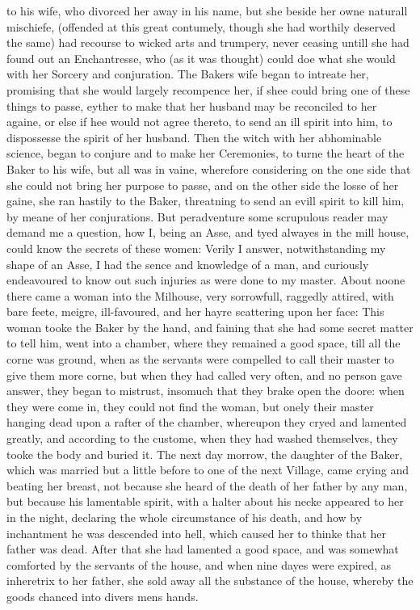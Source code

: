 to his wife, who divorced her away in his name, but she beside her owne
naturall mischiefe, (offended at this great contumely, though she had worthily
deserved the same) had recourse to wicked arts and trumpery, never ceasing
untill she had found out an Enchantresse, who (as it was thought) could doe
what she would with her Sorcery and conjuration. The Bakers wife began to
intreate her, promising that she would largely recompence her, if shee could
bring one of these things to passe, eyther to make that her husband may be
reconciled to her againe, or else if hee would not agree thereto, to send an
ill spirit into him, to dispossesse the spirit of her husband. Then the witch
with her abhominable science, began to conjure and to make her Ceremonies, to
turne the heart of the Baker to his wife, but all was in vaine, wherefore
considering on the one side that she could not bring her purpose to passe, and
on the other side the losse of her gaine, she ran hastily to the Baker,
threatning to send an evill spirit to kill him, by meane of her conjurations.
But peradventure some scrupulous reader may demand me a question, how I, being
an Asse, and tyed alwayes in the mill house, could know the secrets of these
women: Verily I answer, notwithstanding my shape of an Asse, I had the sence
and knowledge of a man, and curiously endeavoured to know out such injuries as
were done to my master. About noone there came a woman into the Milhouse, very
sorrowfull, raggedly attired, with bare feete, meigre, ill-favoured, and her
hayre scattering upon her face: This woman tooke the Baker by the hand, and
faining that she had some secret matter to tell him, went into a chamber, where
they remained a good space, till all the corne was ground, when as the servants
were compelled to call their master to give them more corne, but when they had
called very often, and no person gave answer, they began to mistrust, insomuch
that they brake open the doore: when they were come in, they could not find the
woman, but onely their master hanging dead upon a rafter of the chamber,
whereupon they cryed and lamented greatly, and according to the custome, when
they had washed themselves, they tooke the body and buried it. The next day
morrow, the daughter of the Baker, which was married but a little before to one
of the next Village, came crying and beating her breast, not because she heard
of the death of her father by any man, but because his lamentable spirit, with
a halter about his necke appeared to her in the night, declaring the whole
circumstance of his death, and how by inchantment he was descended into hell,
which caused her to thinke that her father was dead. After that she had
lamented a good space, and was somewhat comforted by the servants of the house,
and when nine dayes were expired, as inheretrix to her father, she sold away
all the substance of the house, whereby the goods chanced into divers mens
hands.

